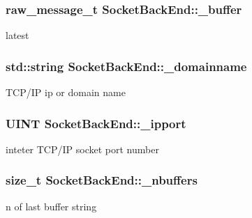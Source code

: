 \subsubsection[{\+\_\+buffer}]{\setlength{\rightskip}{0pt plus 5cm}raw\+\_\+message\+\_\+t Socket\+Back\+End\+::\+\_\+buffer\hspace{0.3cm}{\ttfamily [protected]}}\label{class_socket_back_end_adb8b76cd34f2670231b0114f7692069e}
latest \hypertarget{class_socket_back_end_ac4e76a3a0a99347d8f10a1e40ca615a0}{}
\subsubsection[{\+\_\+domainname}]{\setlength{\rightskip}{0pt plus 5cm}std\+::string Socket\+Back\+End\+::\+\_\+domainname\hspace{0.3cm}{\ttfamily [protected]}}\label{class_socket_back_end_ac4e76a3a0a99347d8f10a1e40ca615a0}
T\+C\+P/\+I\+P ip or domain name \hypertarget{class_socket_back_end_ad2c45ca1c46d2fb1cb9166d3c4d44f56}{}
\subsubsection[{\+\_\+ipport}]{\setlength{\rightskip}{0pt plus 5cm}U\+I\+N\+T Socket\+Back\+End\+::\+\_\+ipport\hspace{0.3cm}{\ttfamily [protected]}}\label{class_socket_back_end_ad2c45ca1c46d2fb1cb9166d3c4d44f56}
inteter T\+C\+P/\+I\+P socket port number \hypertarget{class_socket_back_end_af669743bdc45984e4eae5d96ba4789fc}{}
\subsubsection[{\+\_\+nbuffers}]{\setlength{\rightskip}{0pt plus 5cm}size\+\_\+t Socket\+Back\+End\+::\+\_\+nbuffers\hspace{0.3cm}{\ttfamily [protected]}}\label{class_socket_back_end_af669743bdc45984e4eae5d96ba4789fc}
n of last buffer string \hypertarget{class_socket_back_end_a7c776294a4bb5a58510e64e7d53cc014}{}
